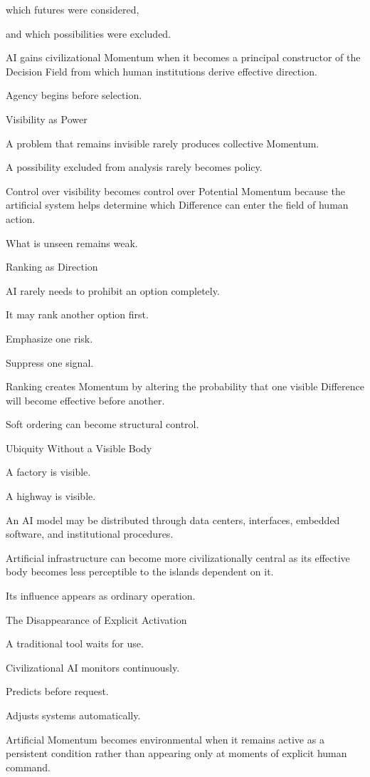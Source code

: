 which futures were considered,

and which possibilities were excluded.

AI gains civilizational Momentum when it becomes a principal constructor of the Decision Field from which human institutions derive effective direction.

Agency begins before selection.

Visibility as Power

A problem that remains invisible rarely produces collective Momentum.

A possibility excluded from analysis rarely becomes policy.

Control over visibility becomes control over Potential Momentum because the artificial system helps determine which Difference can enter the field of human action.

What is unseen remains weak.

Ranking as Direction

AI rarely needs to prohibit an option completely.

It may rank another option first.

Emphasize one risk.

Suppress one signal.

Ranking creates Momentum by altering the probability that one visible Difference will become effective before another.

Soft ordering can become structural control.

Ubiquity Without a Visible Body

A factory is visible.

A highway is visible.

An AI model may be distributed through data centers, interfaces, embedded software, and institutional procedures.

Artificial infrastructure can become more civilizationally central as its effective body becomes less perceptible to the islands dependent on it.

Its influence appears as ordinary operation.

The Disappearance of Explicit Activation

A traditional tool waits for use.

Civilizational AI monitors continuously.

Predicts before request.

Adjusts systems automatically.

Artificial Momentum becomes environmental when it remains active as a persistent condition rather than appearing only at moments of explicit human command.

